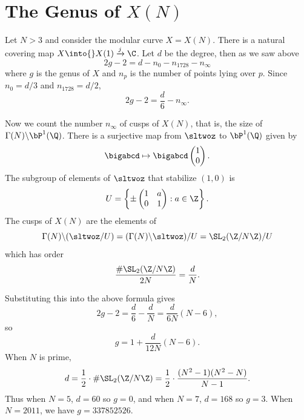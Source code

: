 \documentclass{report}
\begin{document}

\section{The Genus of $X(N)$}\label{sec:genusXN}
Let $N>3$ and consider the modular curve $X=X(N)$.
There is a natural covering map $X\into{}X(1)\xrightarrow{j}\C$.
Let $d$ be the degree, then as we saw above
$$2g-2=d-n_0-n_{1728}-n_{\infty}$$
where $g$ is the genus of $X$ and
$n_p$ is the number of points lying over $p$.
Since $n_0=d/3$ and $n_{1728}=d/2$,
$$
  2g-2=\frac{d}{6} - n_{\infty}.
$$

Now we count the number $n_{\infty}$ of cusps of $X(N)$, that is, the
size of $\Gamma(N)\backslash\bP^1(\Q)$. There is a surjective map
from $\sltwoz$ to $\bP^1(\Q)$ given by
$$\bigabcd\mapsto \bigabcd\left(\begin{matrix}1\\0\end{matrix}\right).$$
The subgroup of elements of $\sltwoz$ that stabilize $(1,0)$
is
$$U=\left\{\pm\left(\begin{matrix}1&a\\0&1\end{matrix}\right):a\in\Z\right\}.
$$
The cusps of $X(N)$ are the elements of
$$\Gamma(N)\backslash(\sltwoz/U)=(\Gamma(N)\backslash\sltwoz)/U=\SL_2(\Z/N\Z)/U$$
which has order $$\frac{\#\SL_2(\Z/N\Z)}{2N}=\frac{d}{N}.$$

Substituting this into the above formula gives
$$2g-2=\frac{d}{6}-\frac{d}{N}=\frac{d}{6N}(N-6),$$
so $$g=1+\frac{d}{12N}(N-6).$$
When $N$ is prime,
$$d=\frac{1}{2}\cdot \#\SL_2(\Z/N\Z)=\frac{1}{2}\cdot\frac{(N^2-1)(N^2-N)}{N-1}.$$
Thus when $N=5$, $d=60$ so $g=0$, and when $N=7$, $d=168$ so $g=3$.
When $N=2011$, we have $g=337852526$.
\end{document}
